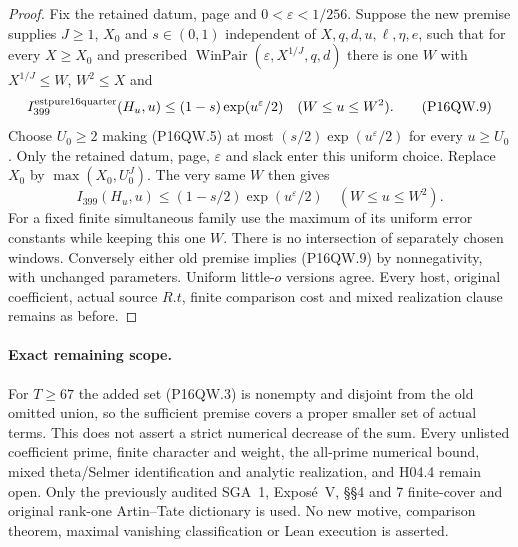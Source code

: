 \begin{proof}
Fix the retained datum, page and $0<\varepsilon<1/256$.
Suppose the new premise supplies $J\geq1$, $X_0$ and
$s\in(0,1)$ independent of $X,q,d,u,\ell,\eta,e$, such that
for every $X\geq X_0$ and prescribed
$\operatorname{WinPair}(\varepsilon,X^{1/J},q,d)$ there is
one $W$ with $X^{1/J}\leq W$, $W^2\leq X$ and
\[
 I_{399}^{\rm estpure16quarter}(H_u,u)\leq(1-s)\exp(u^\varepsilon/2)
                                      \quad(W\leq u\leq W^2).
 \tag{P16QW.9}
\]
Choose $U_0\geq2$ making (P16QW.5) at most
$(s/2)\exp(u^\varepsilon/2)$ for every $u\geq U_0$.
Only the retained datum, page, $\varepsilon$ and slack enter
this uniform choice.  Replace $X_0$ by $\max(X_0,U_0^J)$.
The very same $W$ then gives
\[
 I_{399}(H_u,u)\leq(1-s/2)\exp(u^\varepsilon/2)
                                      \quad(W\leq u\leq W^2).
 \tag{P16QW.10}
\]
For a fixed finite simultaneous family use the maximum of its
uniform error constants while keeping this one $W$.
There is no intersection of separately chosen windows.
Conversely either old premise implies (P16QW.9) by nonnegativity,
with unchanged parameters.  Uniform little-$o$ versions agree.
Every host, original coefficient, actual source $R.t$, finite
comparison cost and mixed realization clause remains as before.
\end{proof}

\paragraph{Exact remaining scope.}
For $T\geq67$ the added set (P16QW.3) is nonempty and disjoint
from the old omitted union, so the sufficient premise covers a
proper smaller set of actual terms.
This does not assert a strict numerical decrease of the sum.
Every unlisted coefficient prime, finite character and weight,
the all-prime numerical bound, mixed theta/Selmer identification
and analytic realization, and H04.4 remain open.
Only the previously audited SGA~1, Expos\'e~V, \S\S4 and 7
finite-cover and original rank-one Artin--Tate dictionary is used.
No new motive, comparison theorem, maximal vanishing classification
or Lean execution is asserted.

